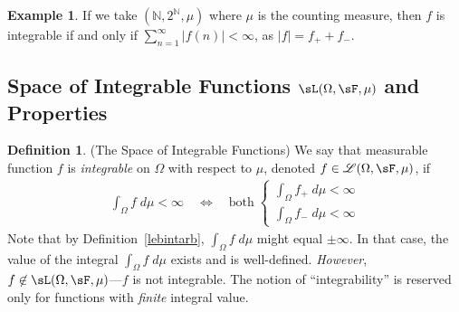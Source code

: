 \documentclass[12pt]{article}
\theoremstyle{plain}
\theoremstyle{definition}
\newtheorem{defn}[thm]{Definition}
\newtheorem{ex}[thm]{Example}
\theoremstyle{remark}
\begin{document}
\begin{ex}
If we take $(\mathbb{N}, 2^\mathbb{N}, \mu)$ where $\mu$ is
the counting measure, then $f$ is integrable if and only if
$\sum^\infty_{n=1}|f(n)|<\infty$, as $|f| = f_+ + f_-$.
\end{ex}


\clearpage
\subsection{Space of Integrable Functions $\sL(\Omega,\sF,\mu)$ and
Properties}

\begin{defn}(The Space of Integrable Functions)
\label{defn:lebintegrability}
We say that measurable function $f$ is \emph{integrable}
on $\Omega$ with respect to $\mu$, denoted
$f\in\mathscr{L}(\Omega,\sF,\mu)$, if
\begin{align*}
  \int_\Omega f \; d\mu
  < \infty
  \quad\iff\quad
  \text{both} \;
  \begin{cases}
    \int_\Omega f_+ \; d\mu < \infty \\
    \int_\Omega f_- \; d\mu < \infty
  \end{cases}
\end{align*}
Note that by Definition~\ref{lebintarb}, $\int_\Omega f\;d\mu$ might
equal $\pm\infty$. In that case, the value of the integral
$\int_\Omega f\;d\mu$ exists and is well-defined. \emph{However},
$f\not\in \sL(\Omega,\sF,\mu)$---$f$ is not integrable.
The notion of ``integrability'' is reserved only for functions with
\emph{finite} integral value.
\end{defn}
\end{document}

